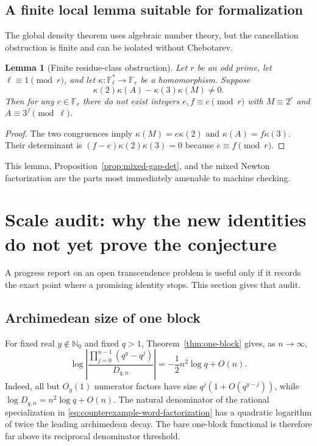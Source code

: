 \documentclass[11pt,oneside]{article}
\newtheorem{lemma}[theorem]{Lemma}
\theoremstyle{definition}
\theoremstyle{remark}
\newcommand{\Nzero}{\mathbb N_0}
\newcommand{\F}{\mathbb F}
\begin{document}
\subsection{A finite local lemma suitable for formalization}

The global density theorem uses algebraic number theory, but the cancellation obstruction is
finite and can be isolated without Chebotarev.

\begin{lemma}[Finite residue-class obstruction]
\label{lem:finite-residue-class-obstruction}
Let $r$ be an odd prime, let $\ell\equiv1\pmod r$, and let
$\kappa:\F_\ell^*\to\F_r$ be a homomorphism.  Suppose
\[
 \kappa(2)\kappa(A)-\kappa(3)\kappa(M)\ne0.
\]
Then for any $c\in\F_r$ there do not exist integers $e,f\equiv c\pmod r$ with
$M\equiv2^e$ and $A\equiv3^f\pmod\ell$.
\end{lemma}

\begin{proof}
The two congruences imply
$\kappa(M)=e\kappa(2)$ and $\kappa(A)=f\kappa(3)$.  Their determinant is
$(f-e)\kappa(2)\kappa(3)=0$ because $e\equiv f\pmod r$.
\end{proof}

This lemma, Proposition~\ref{prop:mixed-gap-det}, and the mixed Newton factorization are the
parts most immediately amenable to machine checking.

\section{Scale audit: why the new identities do not yet prove the conjecture}
\label{sec:scale-audit}

A progress report on an open transcendence problem is useful only if it records the exact
point where a promising identity stops.  This section gives that audit.

\subsection{Archimedean size of one block}

For fixed real $y\notin\Nzero$ and fixed $q>1$, Theorem~\ref{thm:one-block} gives, as
$n\to\infty$,
\begin{equation}
 \log\left|\frac{\prod_{j=0}^{n-1}(q^y-q^j)}{D_{q,n}}\right|
 =-\frac12n^2\log q+O(n).
 \label{eq:block-arch-size}
\end{equation}
Indeed, all but $O_y(1)$ numerator factors have size $q^j(1+O(q^{y-j}))$, while
$\log D_{q,n}=n^2\log q+O(n)$.  The natural denominator of the rational specialization in
\eqref{eq:counterexample-word-factorization} has a quadratic logarithm of twice the leading
archimedean decay.  The bare one-block functional is therefore far above its reciprocal
denominator threshold.
\end{document}
